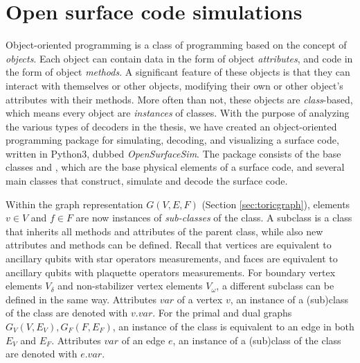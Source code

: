 \chapter{Open surface code simulations}\label{ap:oopsurfacecode}

Object-oriented programming is a class of programming based on the concept of \emph{objects}. Each object can contain data in the form of object \emph{attributes}, and code in the form of object \emph{methods}. A significant feature of these objects is that they can interact with themselves or other objects, modifying their own or other object's attributes with their methods. More often than not, these objects are \emph{class}-based, which means every object are \emph{instances} of classes. With the purpose of analyzing the various types of decoders in the thesis, we have created an object-oriented programming package for simulating, decoding, and visualizing a surface code, written in Python3, dubbed \emph{OpenSurfaceSim}. The package consists of the base classes  and , which are the base physical elements of a surface code, and several main classes that construct, simulate and decode the surface code. 

Within the graph representation $G(V,E,F)$ (Section \ref{sec:toricgraph}), elements $v\in V$ and $f\in F$ are now instances of \emph{sub-classes} of the  class. A subclass is a class that inherits all methods and attributes of the parent class, while also new attributes and methods can be defined. Recall that vertices are equivalent to ancillary qubits with star operators measurements, and faces are equivalent to ancillary qubits with plaquette operators measurements. For boundary vertex elements $V_\delta$ and non-stabilizer vertex elements $V_\omega$, a different subclass can be defined in the same way. Attributes $var$ of a vertex $v$, an instance of a (sub)class of the  class are denoted with $v.var$. For the primal and dual graphs $G_V(V,E_V), G_F(F,E_F)$, an instance of the  class is equivalent to an edge in both $E_V$ and $E_F$. Attributes $var$ of an edge $e$, an instance of a (sub)class of the  class are denoted with $e.var$. 

